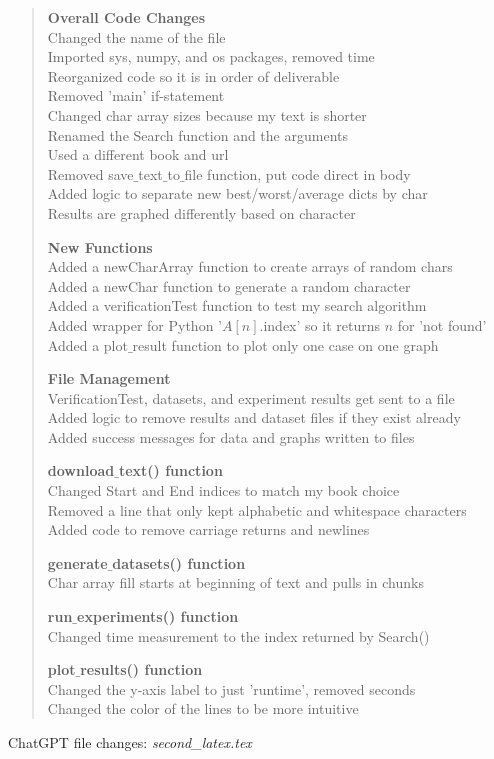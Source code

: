 \documentclass{article}
\begin{document}
\begin{quote}
\textbf{Overall Code Changes} \\
Changed the name of the file\\
Imported sys, numpy, and os packages, removed time \\
Reorganized code so it is in order of deliverable \\
Removed 'main' if-statement \\
Changed char array sizes because my text is shorter \\
Renamed the Search function and the arguments \\
Used a different book and url \\
Removed save$\_$text$\_$to$\_$file function, put code direct in body \\
Added logic to separate new best/worst/average dicts by char \\
Results are graphed differently based on character

\textbf{New Functions} \\
Added a newCharArray function to create arrays of random chars \\
Added a newChar function to generate a random character \\
Added a verificationTest function to test my search algorithm\\
Added wrapper for Python '$A[n]$.index' so it returns $n$ for 'not found' \\
Added a plot$\_$result function to plot only one case on one graph

\textbf{File Management} \\
VerificationTest, datasets, and experiment results get sent to a file \\
Added logic to remove results and dataset files if they exist already \\
Added success messages for data and graphs written to files

\textbf{download$\_$text() function} \\
Changed Start and End indices to match my book choice \\
Removed a line that only kept alphabetic and whitespace characters \\
Added code to remove carriage returns and newlines

\textbf{generate$\_$datasets() function} \\
Char array fill starts at beginning of text and pulls in chunks

\textbf{run$\_$experiments() function} \\
Changed time measurement to the index returned by Search()

\textbf{plot$\_$results() function} \\
Changed the y-axis label to just 'runtime', removed seconds \\
Changed the color of the lines to be more intuitive

\end{quote}
ChatGPT file changes: \textit{second\_latex.tex}
\end{document}
